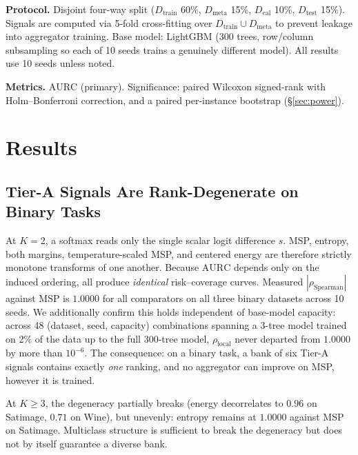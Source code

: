 \documentclass[conference]{IEEEtran}
\newcommand{\aurc}{\mathrm{AURC}}
\newcommand{\rholocal}{\rho_{\mathrm{local}}}
\begin{document}
\textbf{Protocol.} Disjoint four-way split ($D_{\mathrm{train}}$ 60\%, $D_{\mathrm{meta}}$ 15\%, $D_{\mathrm{cal}}$ 10\%, $D_{\mathrm{test}}$ 15\%). Signals are computed via 5-fold cross-fitting over $D_{\mathrm{train}} \cup D_{\mathrm{meta}}$ to prevent leakage into aggregator training. Base model: LightGBM (300 trees, row/column subsampling so each of 10 seeds trains a genuinely different model). All results use 10 seeds unless noted.

\textbf{Metrics.} $\aurc$ (primary). Significance: paired Wilcoxon signed-rank with Holm--Bonferroni correction, and a paired per-instance bootstrap (\S\ref{sec:power}).

\section{Results}
\label{sec:results}

\subsection{Tier-A Signals Are Rank-Degenerate on Binary Tasks}
\label{sec:degeneracy}

At $K{=}2$, a softmax reads only the single scalar logit difference $s$. MSP, entropy, both margins, temperature-scaled MSP, and centered energy are therefore strictly monotone transforms of one another. Because $\aurc$ depends only on the induced ordering, all produce \emph{identical} risk--coverage curves. Measured $|\rho_{\mathrm{Spearman}}|$ against MSP is $1.0000$ for all comparators on all three binary datasets across 10 seeds. We additionally confirm this holds independent of base-model capacity: across 48 (dataset, seed, capacity) combinations spanning a 3-tree model trained on 2\% of the data up to the full 300-tree model, $\rholocal$ never departed from $1.0000$ by more than $10^{-6}$. The consequence: on a binary task, a bank of six Tier-A signals contains exactly \emph{one} ranking, and no aggregator can improve on MSP, however it is trained.

At $K \ge 3$, the degeneracy partially breaks (energy decorrelates to $0.96$ on Satimage, $0.71$ on Wine), but unevenly: entropy remains at $1.0000$ against MSP on Satimage. Multiclass structure is sufficient to break the degeneracy but does not by itself guarantee a diverse bank.
\end{document}
